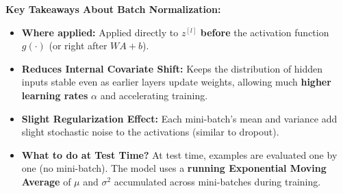 \documentclass[10pt,a4paper]{article}
\begin{document}
\begin{tcolorbox}[
    colframe=accentgreen, colback=white, arc=1.3mm, boxrule=0.5pt,
    left=5pt, right=5pt, top=2pt, bottom=2pt
]
\footnotesize
\textbf{Key Takeaways About Batch Normalization:}
\begin{itemize}[leftmargin=8pt, itemsep=1pt, topsep=0pt]
    \item \textbf{Where applied:} Applied directly to $z^{[l]}$ \textbf{before} the activation function $g(\cdot)$ (or right after $W A + b$).
    \item \textbf{Reduces Internal Covariate Shift:} Keeps the distribution of hidden inputs stable even as earlier layers update weights, allowing much \textbf{higher learning rates} $\alpha$ and accelerating training.
    \item \textbf{Slight Regularization Effect:} Each mini-batch's mean and variance add slight stochastic noise to the activations (similar to dropout).
    \item \textbf{What to do at Test Time?} At test time, examples are evaluated one by one (no mini-batch). The model uses a \textbf{running Exponential Moving Average} of $\mu$ and $\sigma^2$ accumulated across mini-batches during training.
\end{itemize}
\end{tcolorbox}

\vspace{-2pt}
\end{document}
